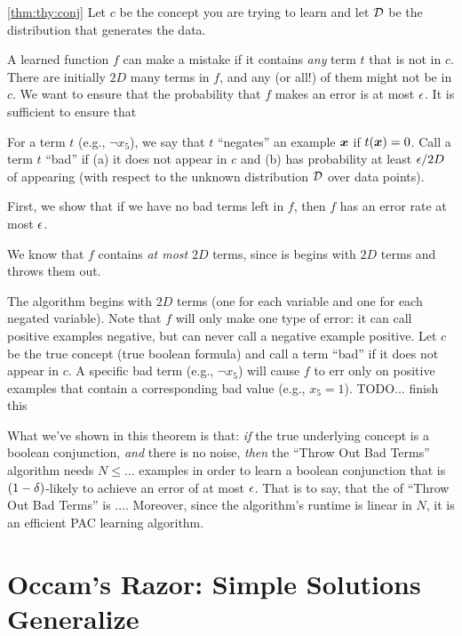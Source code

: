 \begin{myproof}{\ref{thm:thy:conj}}
  Let $c$ be the concept you are trying to learn and let $\mathcal{D}$ be the
  distribution that generates the data.


  A learned function $f$ can make a mistake if it contains \emph{any}
  term $t$ that is not in $c$.  There are initially $2D$ many terms in
  $f$, and any (or all!) of them might not be in $c$.  We want to
  ensure that the probability that $f$ makes an error is at most
  $\epsilon$.  It is sufficient to ensure that 

For a term $t$
  (e.g., $\lnot x_5$), we say that $t$ ``negates'' an example ${\boldsymbol{x}}$ if
  $t({\boldsymbol{x}}) = 0$.  Call a term $t$ ``bad'' if (a) it does not appear in
  $c$ and (b) has probability at least $\epsilon/2D$ of appearing (with
  respect to the unknown distribution $\mathcal{D}$ over data points).

  First, we show that if we have no bad terms left in $f$, then $f$
  has an error rate at most $\epsilon$.  

We know that $f$ contains \emph{at
    most} $2D$ terms, since is begins with $2D$ terms and throws them
  out.  

  The algorithm begins with $2D$ terms (one for each variable and one
  for each negated variable).  Note that $f$ will only make one type
  of error: it can call positive examples negative, but can never call
  a negative example positive.  Let $c$ be the true concept (true
  boolean formula) and call a term ``bad'' if it does not appear in
  $c$.  A specific bad term (e.g., $\lnot x_5$) will cause $f$ to err
  only on positive examples that contain a corresponding bad value
  (e.g., $x_5 = 1$).    TODO... finish this
\end{myproof}

What we've shown in this theorem is that: \emph{if} the true
underlying concept is a boolean conjunction, \emph{and} there is no
noise, \emph{then} the ``Throw Out Bad Terms'' algorithm needs $N \leq
\dots$ examples in order to learn a boolean conjunction that is
$(1-\delta)$-likely to achieve an error of at most $\epsilon$.  That is to
say, that the  of ``Throw Out Bad Terms''
is $\dots$.  Moreover, since the algorithm's runtime is linear in $N$,
it is an efficient PAC learning algorithm.

\section{Occam's Razor: Simple Solutions Generalize}

